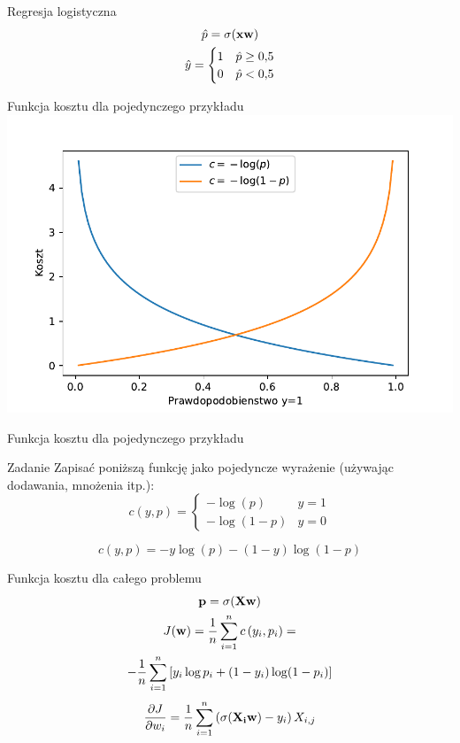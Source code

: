 \documentclass{sa}
\renewcommand{\vec}[1]{\ensuremath\mathbf{#1}}
\begin{document}
\begin{frame}{Regresja logistyczna}
\begin{gather*}
\hat{p} = \sigma(\vec{x}\vec{w}) \\
\hat{y} = \begin{cases}
1 & \hat{p} \geq 0{,}5 \\
0 &\hat{p} < 0{,}5 \\
\end{cases}
\end{gather*}
\end{frame}

\begin{frame}{Funkcja kosztu dla pojedynczego przykładu}
\includegraphics[width=\textwidth]{logreg-cost-single.pdf}
\end{frame}

\begin{frame}{Funkcja kosztu dla pojedynczego przykładu}
\begin{block}{Zadanie}
Zapisać poniższą funkcję jako pojedyncze wyrażenie (używając dodawania, mnożenia itp.):
\[ c(y, p) = \begin{cases} -\log(p) & y=1 \\ -\log(1-p) & y=0 \end{cases} \]
\end{block}
{
\[ c(y,p) = -y\log(p) - (1-y)\log(1-p) \]
}
\end{frame}

\begin{frame}{Funkcja kosztu dla całego problemu}
\begin{gather*}
\vec{p} = \sigma(\vec{X}\vec{w}) \\
J(\vec{w}) = \frac{1}{n} \sum_{i=1}^n c\left(y_i, p_i\right) = \\
-\frac{1}{n} \sum_{i=1}^n \left[ y_i\log p_i + (1-y_i)\log (1-p_i) \right] 
\end{gather*}
\pause
\[\frac{\dd J}{\dd w_i} = \frac{1}{n} \sum_{i=1}^n \left(\sigma(\vec{X_i}\vec{w})-y_i\right)X_{i,j} \]
\end{frame}
\end{document}
